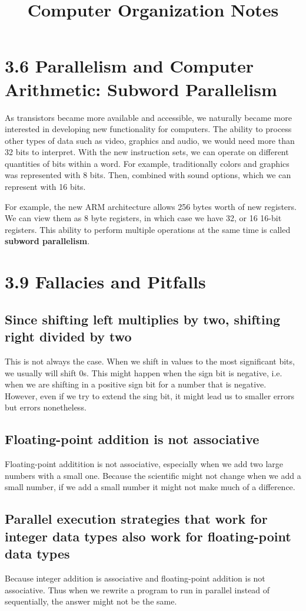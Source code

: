 \documentclass{article}
\title{Computer Organization Notes}
\begin{document}
\section{3.6 Parallelism and Computer Arithmetic: Subword Parallelism}
As transistors became more available and accessible, we naturally became more interested in developing 
new functionality for computers. The ability to process other types of data such as video, graphics and
audio, we would need more than 32 bits to interpret. With the new instruction sets, we can operate on
different quantities of bits within a word. For example, traditionally colors and graphics  was represented
with 8 bits. Then, combined with sound options, which we can represent with 16 bits.

For example, the new ARM architecture allows 256 bytes worth of new registers. We can view them as 8 byte
registers, in which case we have 32, or 16 16-bit registers. This ability to perform multiple operations at the 
same time is called \textbf{subword parallelism}.
\section{3.9 Fallacies and Pitfalls}
\subsection{Since shifting left multiplies by two, shifting right divided by two}

This is not always the case. When we shift in values to the most significant bits, we usually will shift 0s.
This might happen when the sign bit is negative, i.e. when we are shifting in a positive sign bit for a number that
is negative. However, even if we try to extend the sing bit, it might lead us to smaller errors but errors nonetheless.
\subsection{Floating-point addition is not associative}
Floating-point additition is not associative, especially when we add two large numbers with a small one. Because the
scientific might not change when we add a small number, if we add a small number it might not make much of a difference.
\subsection{Parallel execution strategies that work for integer data types also work for floating-point data types}
Because integer addition is associative and floating-point addition is not associative. Thus when we rewrite a 
program to run in parallel instead of sequentially, the answer might not be the same.
\end{document}
